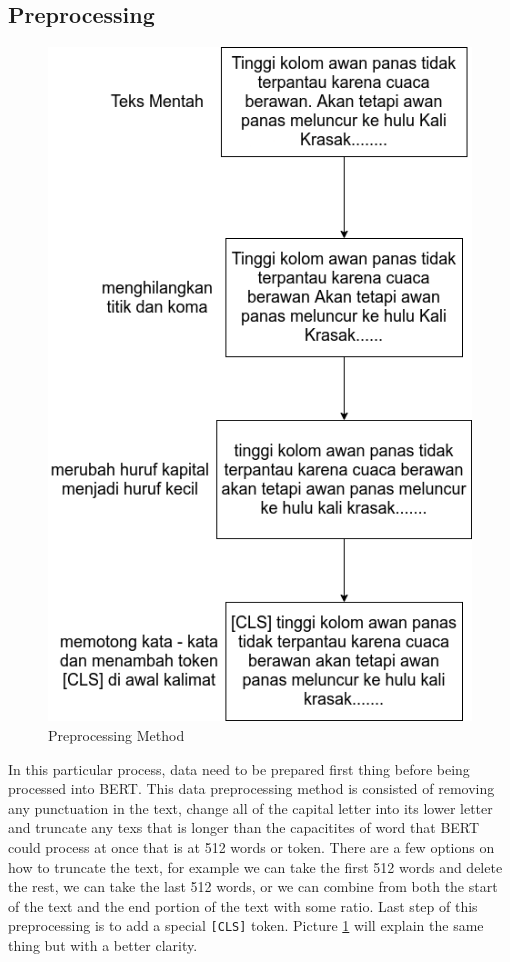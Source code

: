 \subsection{Preprocessing}

\begin{figure}[h!]
    \begin{center}
        \includegraphics[width= .7\linewidth]{gambar/preprocess_long.png}
        \caption{Preprocessing Method}
        \label{fig: metodologi_preprocessing}
    \end{center}
\end{figure}

In this particular process, data need to be prepared first thing before being processed into BERT. This data preprocessing method is consisted of removing any punctuation in the text, change all of the capital letter into its lower letter and truncate any texs that is longer than the capacitites of word that BERT could process at once that is at 512 words or token. There are a few options on how to truncate the text, for example we can take the first 512 words and delete the rest, we can take the last 512 words, or we can combine from both the start of the text and the end portion of the text with some ratio. Last step of this preprocessing is to add a special \texttt{[CLS]} token. Picture \ref{fig: metodologi_preprocessing} will explain the same thing but with a better clarity.

